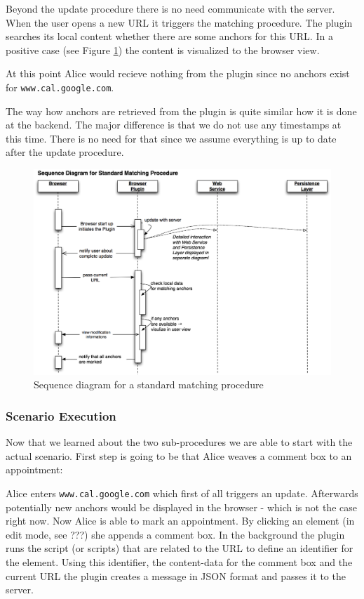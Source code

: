 Beyond the update procedure there is no need communicate with the server. When the user opens a new URL it triggers the matching procedure. The plugin searches its local content whether there are some anchors for this URL. In a positive case (see Figure \ref{sequence-matching-process}) the content is visualized to the browser view. 

At this point Alice would recieve nothing from the plugin since no anchors exist for \verb+www.cal.google.com+. 

The way how anchors are retrieved from the plugin is quite similar how it is done at the backend. The major difference is that we do not use any timestamps at this time. There is no need for that since we assume everything is up to date after the update procedure. 

\begin{figure}[h!] \centering
		\includegraphics[width=13cm]{images/sequence-matching-process.png}
		\caption{Sequence diagram for a standard matching procedure}
		\label{sequence-matching-process}
\end{figure} 

\subsubsection*{Scenario Execution}
Now that we learned about the two sub-procedures we are able to start with the actual scenario. First step is going to be that Alice weaves a comment box to an appointment: 

Alice enters \verb+www.cal.google.com+ which first of all triggers an update. Afterwards potentially new anchors would be displayed in the browser - which is not the case right now. 
Now Alice is able to mark an appointment. By clicking an element (in edit mode, see ???) she appends a comment box. 
In the background the plugin runs the script (or scripts) that are related to the URL to define an identifier for the element. 
Using this identifier, the content-data for the comment box and the current URL the plugin creates a message in JSON format and passes it to the server. 

